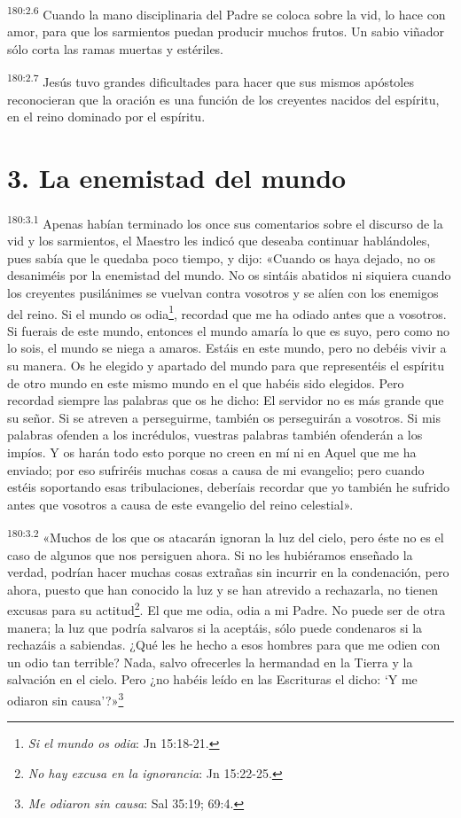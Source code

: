 \par
\textsuperscript{180:2.6} Cuando la mano disciplinaria del Padre se coloca sobre la vid, lo hace con amor, para que los sarmientos puedan producir muchos frutos. Un sabio viñador sólo corta las ramas muertas y estériles.

\par
\textsuperscript{180:2.7} Jesús tuvo grandes dificultades para hacer que sus mismos apóstoles reconocieran que la oración es una función de los creyentes nacidos del espíritu, en el reino dominado por el espíritu.

\section*{3. La enemistad del mundo}
\par
\textsuperscript{180:3.1} Apenas habían terminado los once sus comentarios sobre el discurso de la vid y los sarmientos, el Maestro les indicó que deseaba continuar hablándoles, pues sabía que le quedaba poco tiempo, y dijo: «Cuando os haya dejado, no os desaniméis por la enemistad del mundo. No os sintáis abatidos ni siquiera cuando los creyentes pusilánimes se vuelvan contra vosotros y se alíen con los enemigos del reino. Si el mundo os odia\footnote{\textit{Si el mundo os odia}: Jn 15:18-21.}, recordad que me ha odiado antes que a vosotros. Si fuerais de este mundo, entonces el mundo amaría lo que es suyo, pero como no lo sois, el mundo se niega a amaros. Estáis en este mundo, pero no debéis vivir a su manera. Os he elegido y apartado del mundo para que representéis el espíritu de otro mundo en este mismo mundo en el que habéis sido elegidos. Pero recordad siempre las palabras que os he dicho: El servidor no es más grande que su señor. Si se atreven a perseguirme, también os perseguirán a vosotros. Si mis palabras ofenden a los incrédulos, vuestras palabras también ofenderán a los impíos. Y os harán todo esto porque no creen en mí ni en Aquel que me ha enviado; por eso sufriréis muchas cosas a causa de mi evangelio; pero cuando estéis soportando esas tribulaciones, deberíais recordar que yo también he sufrido antes que vosotros a causa de este evangelio del reino celestial».

\par
\textsuperscript{180:3.2} «Muchos de los que os atacarán ignoran la luz del cielo, pero éste no es el caso de algunos que nos persiguen ahora. Si no les hubiéramos enseñado la verdad, podrían hacer muchas cosas extrañas sin incurrir en la condenación, pero ahora, puesto que han conocido la luz y se han atrevido a rechazarla, no tienen excusas para su actitud\footnote{\textit{No hay excusa en la ignorancia}: Jn 15:22-25.}. El que me odia, odia a mi Padre. No puede ser de otra manera; la luz que podría salvaros si la aceptáis, sólo puede condenaros si la rechazáis a sabiendas. ¿Qué les he hecho a esos hombres para que me odien con un odio tan terrible? Nada, salvo ofrecerles la hermandad en la Tierra y la salvación en el cielo. Pero ¿no habéis leído en las Escrituras el dicho: `Y me odiaron sin causa'?»\footnote{\textit{Me odiaron sin causa}: Sal 35:19; 69:4.}

